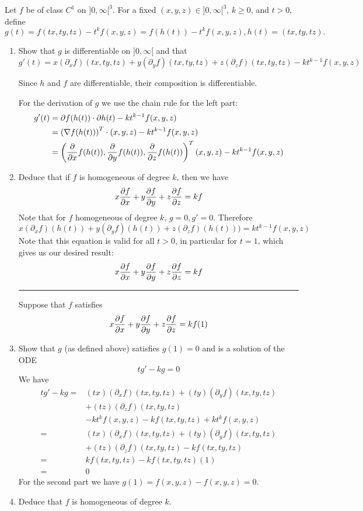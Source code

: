 \documentclass[a4paper,fontsize = 10pt]{article}
\begin{document}
Let $f$ be of class $C^1$ on $]0, \infty[^3$. For a fixed $(x, y, z) \in ]0, \infty[^3$, $k \geq 0$, and $t > 0$, define 
\[g(t) = f(tx, ty, tz) - t^kf(x,y,z) = f(h(t)) - t^kf(x,y,z), h(t) = (tx,ty,tz).\]
\begin{enumerate}[label=(\alph*)]
  \item Show that $g$ is differentiable on $]0, \infty[$ and that\\ 
  \(g'(t) = x(\partial_xf)(tx,ty,tz)+y(\partial_y f)(tx,ty,tz) + z (\partial_z f)(tx,ty,tz) - k t^{k-1}f(x,y,z)\)

  Since $h$ and $f$ are differentiable, their composition is differentiable.

  For the derivation of $g$ we use the chain rule for the left part:
  \begin{align*}
    g'(t) &= \partial f(h(t)) \cdot \partial h(t) - kt^{k-1}f(x,y,z)\\
    &= \left(\nabla f(h(t))\right)^T \cdot (x,y,z) - kt^{k-1}f(x,y,z)\\
    &= \left(\pdv{}{x}f(h(t)), \pdv{}{y}f(h(t)), \pdv{}{z}f(h(t))\right)^T (x,y,z) - kt^{k-1}f(x,y,z)
  \end{align*}



  \item Deduce that if $f$ is homogeneous of degree $k$, then we have
  \[x \pdv{f}{x} + y \pdv{f}{y} + z \pdv{f}{z} = kf\]
  Note that for $f$ homogeneous of degree $k$, $g = 0, g' = 0$. Therefore
  \[ x(\partial_xf)(h(t))+y(\partial_y f)(h(t)) + z (\partial_z f)(h(t))) = k t^{k-1}f(x,y,z)\]
  Note that this equation is valid for all $t > 0$, in particular for $t = 1$, which gives us our desired result:
  \[x \pdv{f}{x} + y \pdv{f}{y} + z \pdv{f}{z} = kf\]
  \vspace{0.1cm}
  \hrule
  \vspace{0.2cm}
  Suppose that $f$ satisfies 
  \[x \pdv{f}{x} + y \pdv{f}{y} + z \pdv{f}{z} = kf (1)\]
  \item Show that $g$ (as defined above) satisfies $g(1) = 0$ and is a solution of the ODE 
  \[tg' - kg = 0\] 
  We have 
  \begin{align*}
    tg' - kg =& (tx)(\partial_xf)(tx,ty,tz)+(ty)(\partial_y f)(tx,ty,tz)\\ 
    &+ (tz) (\partial_z f)(tx,ty,tz)\\ 
    &- k t^{k}f(x,y,z) - kf(tx,ty,tz) + k t^kf(x,y,z)\\
    =& (tx)(\partial_xf)(tx,ty,tz)+(ty)(\partial_y f)(tx,ty,tz)\\ 
    &+ (tz) (\partial_z f)(tx,ty,tz) - kf(tx,ty,tz)\\
    =& kf(tx,ty,tz) - kf(tx,ty,tz) (1)\\
    =& 0
  \end{align*}
  For the second part we have $g(1) = f(x,y,z) -f(x,y,z) = 0$.
  \item Deduce that $f$ is homogeneous of degree $k$.
  

\end{enumerate}
\end{document}

